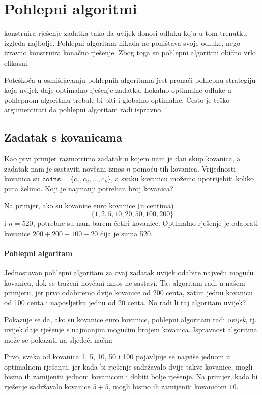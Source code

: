 \chapter{Pohlepni algoritmi}


konstruira rješenje zadatka
tako da uvijek donosi odluku koja
u tom trenutku izgleda najbolje.
Pohlepni algoritam nikada ne poništava
svoje odluke, nego izravno konstruira
konačno rješenje.
Zbog toga su pohlepni algoritmi
obično vrlo efikasni.

Poteškoća u osmišljavanju pohlepnih algoritama
jest pronaći pohlepnu strategiju
koja uvijek daje optimalno rješenje
zadatka.
Lokalno optimalne odluke u pohlepnom
algoritmu trebale bi biti i globalno optimalne.
Često je teško argumentirati da
pohlepni algoritam radi ispravno.

\section{Zadatak s kovanicama}

Kao prvi primjer razmotrimo zadatak
u kojem nam je dan skup kovanica,
a zadatak nam je sastaviti novčani iznos $n$
pomoću tih kovanica.
Vrijednosti kovanica su
$\texttt{coins}=\{c_1,c_2,\ldots,c_k\}$,
a svaku kovanicu možemo upotrijebiti koliko puta želimo.
Koji je najmanji potreban broj kovanica?

Na primjer, ako su kovanice euro kovanice (u centima)
\[\{1,2,5,10,20,50,100,200\}\]
i $n=520$,
potrebne su nam barem četiri kovanice.
Optimalno rješenje je odabrati kovanice
$200+200+100+20$ čija je suma 520.

\subsubsection{Pohlepni algoritam}

Jednostavan pohlepni algoritam za ovaj zadatak
uvijek odabire najveću moguću kovanicu,
dok se traženi novčani iznos ne sastavi.
Taj algoritam radi u našem primjeru,
jer prvo odabiremo dvije kovanice od 200 centa,
zatim jednu kovanicu od 100 centa i naposljetku jednu od 20 centa.
No radi li taj algoritam uvijek?

Pokazuje se da, ako su kovanice euro kovanice,
pohlepni algoritam radi \emph{uvijek}, tj.
uvijek daje rješenje s najmanjim
mogućim brojem kovanica.
Ispravnost algoritma može se
pokazati na sljedeći način:

Prvo, svaka od kovanica 1, 5, 10, 50 i 100 pojavljuje se
najviše jednom u optimalnom rješenju,
jer kada bi
rješenje sadržavalo dvije takve kovanice,
mogli bismo ih zamijeniti jednom kovanicom i
dobiti bolje rješenje.
Na primjer, kada bi rješenje sadržavalo
kovanice $5+5$, mogli bismo ih zamijeniti kovanicom $10$.

